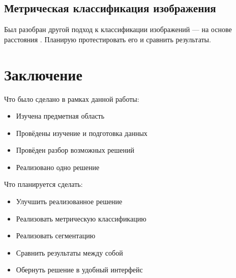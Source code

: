 \documentclass[14pt]{matmex-diploma}
\begin{document}
    \subsection{Метрическая классификация изображения}
        
        Был разобран другой подход к классификации изображений — на основе расстояния \cite{paper:oneshot}. Планирую протестировать его и сравнить результаты.

\section*{Заключение}

    Что было сделано в рамках данной работы:
    
    \begin{itemize}
        \item Изучена предметная область
        \item Провёдены изучение и подготовка данных
        \item Провёден разбор возможных решений
        \item Реализовано одно решение 
    \end{itemize}      
        
    Что планируется сделать:
    
    \begin{itemize}
        \item Улучшить реализованное решение
        \item Реализовать метрическую классификацию
        \item Реализовать сегментацию
        \item Сравнить результаты между собой
        \item Обернуть решение в удобный интерфейс
    \end{itemize}      


\setmonofont[Mapping=tex-text]{CMU Typewriter Text}


\end{document}
